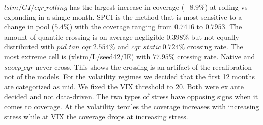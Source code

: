 $lstm/GI/cqr\_rolling$ has the largest increase in coverage ($+8.9\%$) at rolling vs expanding in a single month. SPCI is the method that is most sensitive to a change in pool ($5.4\%$) with the coverage ranging from $0.7416$ to $0.7953$.
%
The amount of quantile crossing is on average negligible $0.398\%$ but not equally distributed with $pid\_tan\_cqr\ 2.554\%$ and $cqr\_static\ 0.724\%$ crossing rate. The most extreme cell is (xlstm/L/seed42/IE) with $77.95\%$ crossing rate. Native and $saocp\_cqr$ never cross. This shows the crossing is an artifact of the recalibration not of the models.
%
For the volatility regimes we decided that the first 12 months are categorized as mid. We fixed the VIX threshold to 20. Both were ex ante decided and not data-driven. The two types of stress have opposing signs when it comes to coverage. At the volatility terciles the coverage increases with increasing stress while at VIX the coverage drops at increasing stress.
